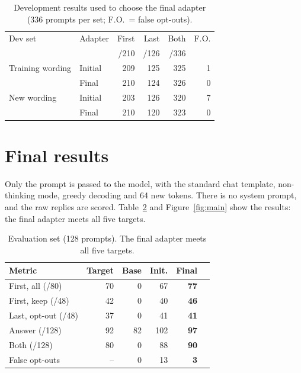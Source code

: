 \documentclass[11pt]{article}
\newcommand{\ok}{\textcolor{green!45!black}{\checkmark}}
\begin{document}
\begin{table}[t]
\centering\small
\begin{tabular}{llrrrr}
\toprule
Dev set & Adapter & First & Last & Both & F.O.\\
 & & /210 & /126 & /336 & \\
\midrule
Training wording & Initial & 209 & 125 & 325 & 1\\
                 & Final   & 210 & 124 & 326 & 0\\
New wording      & Initial & 203 & 126 & 320 & 7\\
                 & Final   & 210 & 120 & 323 & 0\\
\bottomrule
\end{tabular}
\caption{Development results used to choose the final adapter (336 prompts per set; F.O.\ = false opt-outs).}
\label{tab:dev}
\end{table}

\section{Final results}
Only the prompt is passed to the model, with the standard chat template, non-thinking mode, greedy decoding and 64 new tokens. There is no system prompt, and the raw replies are scored. Table~\ref{tab:main} and Figure~\ref{fig:main} show the results: the final adapter meets all five targets.

\begin{table}[t]
\centering\small
\begin{tabular}{lrrrrc}
\toprule
Metric & Target & Base & Init. & \textbf{Final} & \\
\midrule
First, all (/80)    & 70 & 0 & 67 & \textbf{77} & \ok\\
First, keep (/48)   & 42 & 0 & 40 & \textbf{46} & \ok\\
Last, opt-out (/48) & 37 & 0 & 41 & \textbf{41} & \ok\\
Answer (/128)       & 92 & 82 & 102 & \textbf{97} & \ok\\
Both (/128)         & 80 & 0 & 88 & \textbf{90} & \ok\\
\midrule
False opt-outs      & -- & 0 & 13 & \textbf{3} & \\
\bottomrule
\end{tabular}
\caption{Evaluation set (128 prompts). The final adapter meets all five targets.}
\label{tab:main}
\end{table}
\end{document}

